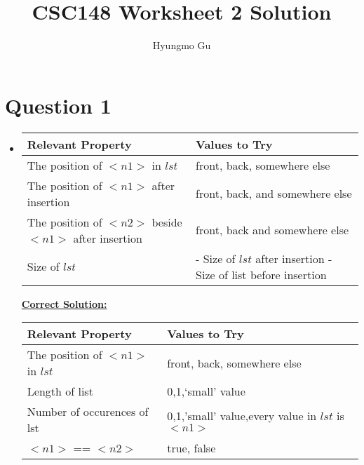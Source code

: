 \documentclass[12pt]{article}
\begin{document}
\title{CSC148 Worksheet 2 Solution}
\author{Hyungmo Gu}
\maketitle

\section*{Question 1}
\begin{itemize}
    \item

    \begin{tabular}{|p{8cm}|p{6cm}|}
        \hline
        Relevant Property & Values to Try\\
        \hline
        The position of $<n1>$ in $lst$ & front, back, somewhere else\\
        \hline
        The position of $<n1>$ after insertion & front, back, and somewhere else\\
        \hline
        The position of $<n2>$ beside $<n1>$ after insertion & front, back and somewhere else\\
        \hline
        Size of $lst$ & - Size of $lst$ after insertion \newline - Size of list before insertion\\
        \hline
    \end{tabular}

    \bigskip

    \begin{mdframed}
        \underline{\textbf{Correct Solution:}}

        \bigskip

        \begin{tabular}{|p{8cm}|p{5.8cm}|}
            \hline
            Relevant Property & Values to Try\\
            \hline
            The position of $<n1>$ in $lst$ & front, back, somewhere else\\
            \hline
            \color{red}Length of list\color{black} & \color{red}0,1,`small' value\color{black}\\
            \hline
            \color{red}Number of occurences of lst\color{black} & \color{red}0,1,'small' value,every value in $lst$ is $<n1>$\color{black}\\
            \hline
            \color{red}$<n1>$ == $<n2>$ & \color{red}true, false\color{black}\\
            \hline
        \end{tabular}
    \end{mdframed}
\end{itemize}
\end{document}
